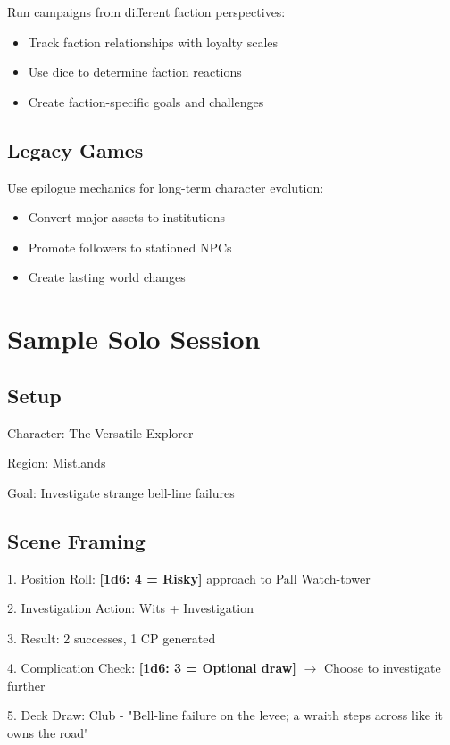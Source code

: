 \documentclass[11pt]{article}
\newcommand{\dice}[1]{\textbf{[1d6: #1]}}
\begin{document}
Run campaigns from different faction perspectives:
\begin{itemize}
    \item Track faction relationships with loyalty scales
    \item Use dice to determine faction reactions
    \item Create faction-specific goals and challenges
\end{itemize}

\subsection{Legacy Games}

Use epilogue mechanics for long-term character evolution:
\begin{itemize}
    \item Convert major assets to institutions
    \item Promote followers to stationed NPCs
    \item Create lasting world changes
\end{itemize}

\section{Sample Solo Session}

\subsection{Setup}

Character: The Versatile Explorer

Region: Mistlands

Goal: Investigate strange bell-line failures

\subsection{Scene Framing}

1. Position Roll: \dice{4 = Risky} approach to Pall Watch-tower

2. Investigation Action: Wits + Investigation

3. Result: 2 successes, 1 CP generated

4. Complication Check: \dice{3 = Optional draw} $\rightarrow$ Choose to investigate further

5. Deck Draw: Club - "Bell-line failure on the levee; a wraith steps across like it owns the road"
\end{document}
